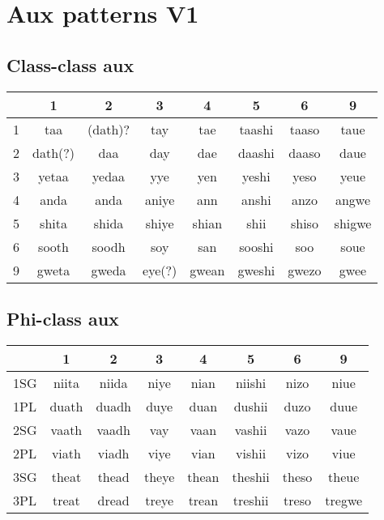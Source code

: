 \documentclass[11pt]{article}
\begin{document}
\section{Aux patterns V1}
\subsection{Class-class aux}

\begin{center}
	\begin{tabular}{|l|c|c|c|c|c|c|c|}
	\hline
	& 1 & 2 & 3 & 4 & 5 & 6 & 9 \\ \hline
	1 & taa & (dath)? & tay & tae & taashi & taaso & taue \\ \hline
	2 & dath(?) & daa & day & dae & daashi & daaso & daue \\ \hline
	3 & yetaa & yedaa & yye & yen & yeshi & yeso & yeue \\ \hline
	4 & anda & anda & aniye & ann & anshi & anzo & angwe \\ \hline
	5 & shita & shida & shiye & shian & shii & shiso & shigwe \\ \hline
    6 & sooth & soodh & soy & san & sooshi & soo & soue \\ \hline
    9 & gweta & gweda & eye(?) & gwean & gweshi & gwezo & gwee \\ \hline
	\end{tabular}
\end{center}

\subsection{Phi-class aux}
\begin{center}
	\begin{tabular}{|l|c|c|c|c|c|c|c|}
	\hline
	& 1 & 2 & 3 & 4 & 5 & 6 & 9 \\ \hline
    1SG & niita & niida & niye & nian & niishi & nizo & niue  \\ \hline
    1PL & duath & duadh & duye & duan & dushii & duzo & duue \\ \hline 
    2SG & vaath & vaadh & vay & vaan & vashii & vazo & vaue \\ \hline
    2PL & viath & viadh & viye & vian & vishii & vizo & viue \\ \hline
  	3SG & theat & thead & theye & thean & theshii & theso & theue \\ \hline
  	3PL & treat & dread & treye & trean & treshii & treso & tregwe \\ \hline
	\end{tabular}
\end{center}
\end{document}
